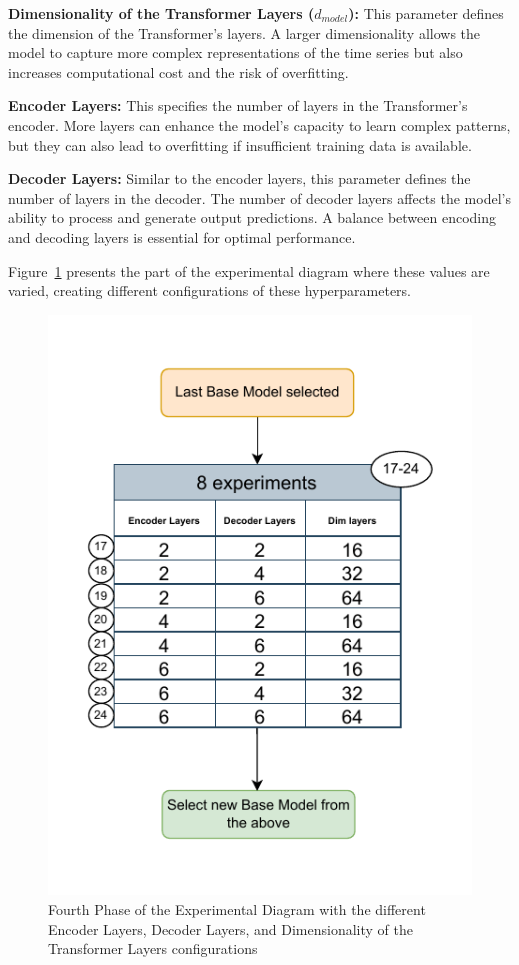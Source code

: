 \textbf{Dimensionality of the Transformer Layers (\(d_{model}\)):} This parameter defines the dimension of the Transformer's layers. A larger dimensionality allows the model to capture more complex representations of the time series but also increases computational cost and the risk of overfitting.

\vspace{10pt}

\noindent\textbf{Encoder Layers:} This specifies the number of layers in the Transformer's encoder. More layers can enhance the model's capacity to learn complex patterns, but they can also lead to overfitting if insufficient training data is available.

\vspace{10pt}

\noindent\textbf{Decoder Layers:} Similar to the encoder layers, this parameter defines the number of layers in the decoder. The number of decoder layers affects the model's ability to process and generate output predictions. A balance between encoding and decoding layers is essential for optimal performance.

Figure~\ref{D4} presents the part of the experimental diagram where these values are varied, creating different configurations of these hyperparameters.

\begin{figure}[htbp]
    \centering
    \includegraphics[width=8 cm]{5_ChapterDesign/figuras/Diagrams/D4.pdf}
    \caption{Fourth Phase of the Experimental Diagram with the different Encoder Layers, Decoder Layers, and Dimensionality of the Transformer Layers configurations}
    \label{D4}
\end{figure}


